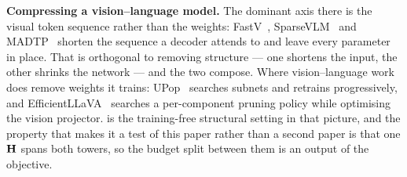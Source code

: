 \textbf{Compressing a vision--language model.} The dominant axis there is the visual token sequence
rather than the weights: FastV~\citep{chen2024fastv}, SparseVLM~\citep{zhang2025sparsevlm} and
MADTP~\citep{cao2024madtp} shorten the sequence a decoder attends to and leave every parameter in
place. That is orthogonal to removing structure --- one shortens the input, the other shrinks the
network --- and the two compose. Where vision--language work does remove weights it trains:
UPop~\citep{shi2023upop} searches subnets and retrains progressively, and
EfficientLLaVA~\citep{liang2025efficientllava} searches a per-component pruning policy while
optimising the vision projector.  is the training-free structural setting in that
picture, and the property that makes it a test of this paper rather than a second paper is that one
$\mathbf{H}$ spans both towers, so the budget split between them is an output of the objective.
